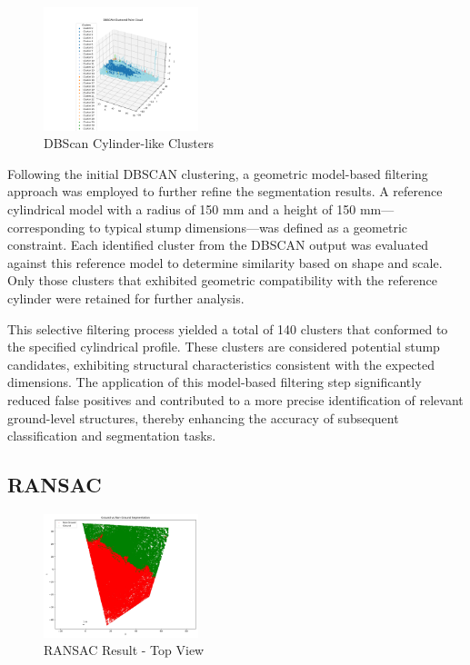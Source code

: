 \documentclass[../report.tex]{subfiles}
\begin{document}
    \begin{figure}[H]
        \centering
        \includegraphics[width=0.4\textwidth]{rnd-project-report-main/figures/Clustering_2_filtered_point_cloud_with labels.png}
        \caption{DBScan Cylinder-like Clusters}
    \end{figure}
    Following the initial DBSCAN clustering, a geometric model-based filtering approach was employed to further refine the segmentation results. A reference cylindrical model with a radius of 150 mm and a height of 150 mm—corresponding to typical stump dimensions—was defined as a geometric constraint. Each identified cluster from the DBSCAN output was evaluated against this reference model to determine similarity based on shape and scale. Only those clusters that exhibited geometric compatibility with the reference cylinder were retained for further analysis.

    This selective filtering process yielded a total of 140 clusters that conformed to the specified cylindrical profile. These clusters are considered potential stump candidates, exhibiting structural characteristics consistent with the expected dimensions. The application of this model-based filtering step significantly reduced false positives and contributed to a more precise identification of relevant ground-level structures, thereby enhancing the accuracy of subsequent classification and segmentation tasks.

    \subsection{RANSAC}
    \begin{figure}[H]
        \centering
        \includegraphics[width=0.4\textwidth]{rnd-project-report-main/figures/ground_non_ground_with_legend.jpg}
        \caption{RANSAC Result - Top View}
    \end{figure}
    
\end{document}
